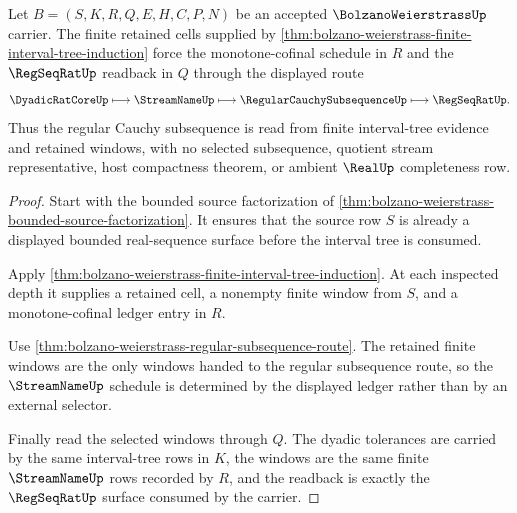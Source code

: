 \begin{theorem}
\label{thm:bolzanoweierstrass-regular-cauchy-subsequence-readback}
Let $B=(S,K,R,Q,E,H,C,P,N)$ be an accepted $\BolzanoWeierstrassUp$ carrier. The finite retained cells supplied by \autoref{thm:bolzano-weierstrass-finite-interval-tree-induction} force the monotone-cofinal schedule in $R$ and the $\RegSeqRatUp$ readback in $Q$ through the displayed route
$$
\DyadicRatCoreUp \longmapsto \StreamNameUp \longmapsto \RegularCauchySubsequenceUp \longmapsto \RegSeqRatUp .
$$
Thus the regular Cauchy subsequence is read from finite interval-tree evidence and retained windows, with no selected subsequence, quotient stream representative, host compactness theorem, or ambient $\RealUp$ completeness row.
\end{theorem}
\begin{proof}
Start with the bounded source factorization of \autoref{thm:bolzano-weierstrass-bounded-source-factorization}. It ensures that the source row $S$ is already a displayed bounded real-sequence surface before the interval tree is consumed.

Apply \autoref{thm:bolzano-weierstrass-finite-interval-tree-induction}. At each inspected depth it supplies a retained cell, a nonempty finite window from $S$, and a monotone-cofinal ledger entry in $R$.

Use \autoref{thm:bolzano-weierstrass-regular-subsequence-route}. The retained finite windows are the only windows handed to the regular subsequence route, so the $\StreamNameUp$ schedule is determined by the displayed ledger rather than by an external selector.

Finally read the selected windows through $Q$. The dyadic tolerances are carried by the same interval-tree rows in $K$, the windows are the same finite $\StreamNameUp$ rows recorded by $R$, and the readback is exactly the $\RegSeqRatUp$ surface consumed by the carrier.
\end{proof}

